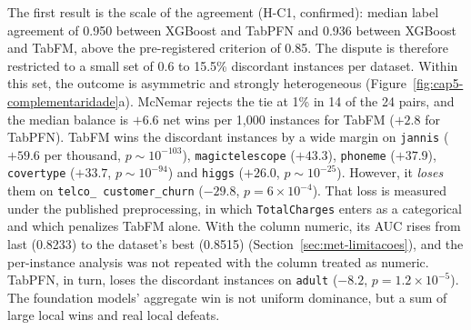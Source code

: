 The first result is the scale of the agreement (H-C1,
confirmed): median label agreement of 0.950 between XGBoost
and TabPFN and 0.936 between XGBoost and TabFM, above the
pre-registered criterion of 0.85. The dispute is therefore restricted to a small set of 0.6 to 15.5\% discordant instances per
dataset. Within this set, the outcome is asymmetric and strongly
heterogeneous (Figure~\ref{fig:cap5-complementaridade}a). McNemar
rejects the tie at 1\% in 14 of the 24 pairs, and the median
balance is $+6.6$ net wins per 1{,}000 instances for TabFM ($+2.8$ for
TabPFN). TabFM wins the discordant instances by a wide margin on
\texttt{jannis} ($+59.6$ per thousand,
$p \sim 10^{-103}$), \texttt{magictelescope} ($+43.3$),
\texttt{phoneme} ($+37.9$), \texttt{covertype} ($+33.7$,
$p \sim 10^{-94}$) and \texttt{higgs} ($+26.0$, $p \sim 10^{-25}$).
However, it \emph{loses} them on \texttt{telco\_\allowbreak
customer\_\allowbreak churn} ($-29.8$, $p = 6 \times 10^{-4}$). That
loss is measured under the published preprocessing, in which
\texttt{TotalCharges} enters as a categorical and which
penalizes TabFM alone. With the column numeric, its AUC rises from
last (0.8233) to the dataset's best (0.8515)
(Section~\ref{sec:met-limitacoes}), and the per-instance analysis was not
repeated with the column treated as numeric. TabPFN, in turn, loses
the discordant instances on
\texttt{adult} ($-8.2$, $p = 1.2 \times 10^{-5}$). The foundation
models' aggregate win is not uniform dominance, but a sum
of large local wins and real local defeats.

